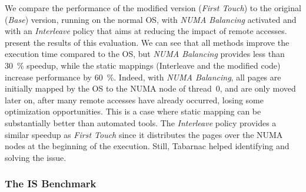 We compare the performance of the modified version (\emph{First Touch}) to the original (\emph{Base}) version, running on the normal OS, with \emph{NUMA Balancing} activated and with an \emph{Interleave} policy that aims at reducing the impact of remote accesses.
 present the results of this evaluation.
We can see that all methods improve the execution time compared to the \gls{OS}, but \emph{NUMA Balancing} provides less than \SI{30}{\%} speedup, while the static mappings (Interleave and the modified code) increase performance by \SI{60}{\%}.
Indeed, with \emph{NUMA Balancing}, all pages are initially mapped by the \gls{OS} to the \gls{NUMA} node of thread~$0$, and are only moved later on, after many remote accesses have already occurred, losing some optimization opportunities.
This is a case where static mapping can be substantially better than automated tools.
The \emph{Interleave} policy provides a similar speedup as \emph{First Touch} since it distributes the pages over the \gls{NUMA} nodes at the beginning of the execution.
Still, \gls{Tabarnac} helped identifying and solving the issue.

\subsubsection{The IS Benchmark}

